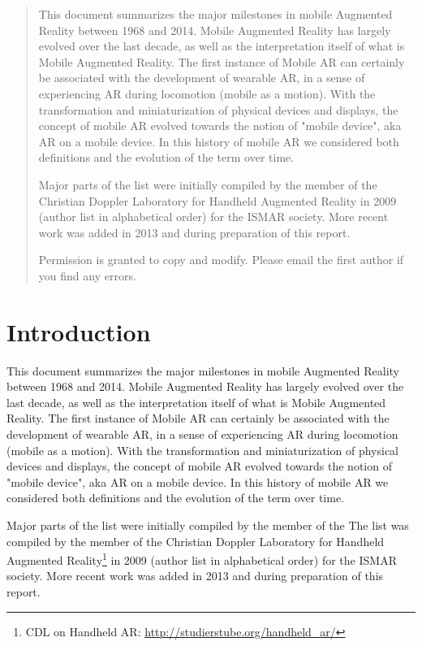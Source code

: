 \documentclass[12pt,a4paper]{article}
\begin{document}
\begin{abstract}
This document summarizes the major milestones in mobile Augmented Reality between 1968 and 2014. Mobile Augmented Reality has largely evolved over the last decade, as well as the interpretation itself of what is Mobile Augmented Reality. The first instance of Mobile AR can certainly be associated with the development of wearable AR, in a sense of experiencing AR during locomotion (mobile as a motion). With the transformation and miniaturization of physical devices and displays, the concept of mobile AR evolved towards the notion of "mobile device", aka AR on a mobile device. In this history of mobile AR we considered both definitions and the evolution of the term over time. 

Major parts of the list were initially compiled by the member of the Christian Doppler Laboratory for Handheld Augmented Reality in 2009 (author list in alphabetical order) for the ISMAR society. More recent work was added in 2013 and during preparation of this report.  

Permission is granted to copy and modify. Please email the first author if you find any errors.
\end{abstract}

\section*{Introduction}  

This document summarizes the major milestones in mobile Augmented Reality between 1968 and 2014. Mobile Augmented Reality has largely evolved over the last decade, as well as the interpretation itself of what is Mobile Augmented Reality. The first instance of Mobile AR can certainly be associated with the development of wearable AR, in a sense of experiencing AR during locomotion (mobile as a motion). With the transformation and miniaturization of physical devices and displays, the concept of mobile AR evolved towards the notion of "mobile device", aka AR on a mobile device. In this history of mobile AR we considered both definitions and the evolution of the term over time. 

Major parts of the list were initially compiled by the member of the The list was compiled by the member of the Christian Doppler Laboratory for Handheld Augmented Reality\footnote{CDL on Handheld AR: \url{http://studierstube.org/handheld_ar/}} in 2009 (author list in alphabetical order) for the ISMAR society. More recent work was added in 2013 and during preparation of this report.  
\end{document}
